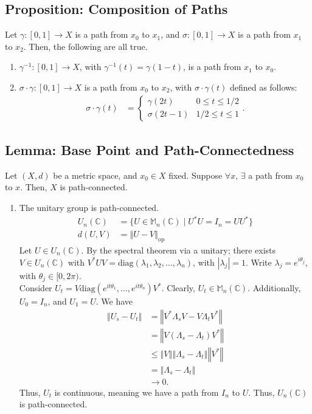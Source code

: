\documentclass[10pt]{extarticle}
\newcommand{\norm}[1]{\left\Vert #1 \right\Vert}
\begin{document}
  \subsection{Proposition: Composition of Paths}%
  Let $\gamma: [0,1] \rightarrow X$ is a path from $x_0$ to $x_1$, and $\sigma: [0,1]\rightarrow X$ is a path from $x_1$ to $x_2$. Then, the following are all true.
  \begin{enumerate}[(1)]
    \item $\gamma^{-1}: [0,1]\rightarrow X$, with $\gamma^{-1}(t) = \gamma(1-t)$, is a path from $x_1$ to $x_0$.
    \item $\sigma \cdot \gamma: [0,1]\rightarrow X$ is a path from $x_0$ to $x_2$, with $\sigma \cdot \gamma(t)$ defined as follows:
      \begin{align*}
        \sigma \cdot \gamma(t) &= \begin{cases}
          \gamma(2t)&0\leq t \leq 1/2\\
          \sigma(2t-1) & 1/2 \leq t \leq 1
        \end{cases}.
      \end{align*}
  \end{enumerate}
  \subsection{Lemma: Base Point and Path-Connectedness}%
  Let $(X,d)$ be a metric space, and $x_0\in X$ fixed. Suppose $\forall x$, $\exists $ a path from $x_0$ to $x$. Then, $X$ is path-connected.
  \begin{enumerate}[(1)]
    \item The unitary group is path-connected.
      \begin{align*}
        U_n(\mathbb{C}) &= \{U\in \mathbb{M}_n(\mathbb{C})\mid U^{\ast}U = I_n = UU^{\ast}\}\\
        d(U,V) &= \norm{U-V}_{\text{op}}
      \end{align*}
      Let $U\in U_n(\mathbb{C})$. By the spectral theorem via a unitary; there exists $V\in U_n(\mathbb{C})$ with $V^{\ast} U V = \text{diag}(\lambda_1,\lambda_2,\dots,\lambda_n)$, with $|\lambda_j| = 1$. Write $\lambda_j = e^{i\theta_j}$, with $\theta_j\in [0,2\pi)$.\\

      Consider $U_t = V\text{diag}\left(e^{it\theta_1},\dots,e^{it\theta_n}\right)V^{\ast}$. Clearly, $U_t\in \mathbb{M}_n(\mathbb{C})$. Additionally, $U_0 = I_n$, and $U_1 = U$. We have
      \begin{align*}
        \norm{U_s - U_t} &= \norm{V^{\ast}\Lambda_s V - V\Lambda_tV^{\ast}}\\
                         &= \norm{V(\Lambda_s - \Lambda_t)V^{\ast}}\\
                         &\leq \norm{V}\norm{\Lambda_s - \Lambda_t}\norm{V^{\ast}}\\
                         &= \norm{\Lambda_s - \Lambda_t}\\
                         &\rightarrow 0.
      \end{align*}
      Thus, $U_t$ is continuous, meaning we have a path from $I_n$ to $U$. Thus, $U_n(\mathbb{C})$ is path-connected.
  \end{enumerate}
\end{document}
